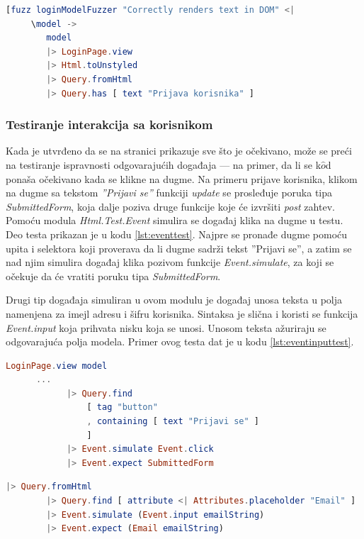 \documentclass[12pt,oneside]{memoir}
\begin{document}
\begin{lstlisting}[language=elm, caption={Test za funkciju \emph{view} modula \emph{LoginPage}},captionpos=b, label={lst:viewtest}]
    [fuzz loginModelFuzzer "Correctly renders text in DOM" <|
     \model ->
        model
        |> LoginPage.view 
        |> Html.toUnstyled
        |> Query.fromHtml
        |> Query.has [ text "Prijava korisnika" ]
\end{lstlisting}


\subsubsection{Testiranje interakcija sa korisnikom}

\par Kada je utvrđeno da se na stranici prikazuje sve što je očekivano, može se preći na testiranje ispravnosti odgovarajućih događaja --- na primer, da li se k$\hat{o}$d ponaša očekivano kada se klikne na dugme. Na primeru prijave korisnika, klikom na dugme sa tekstom \emph{''Prijavi se''} funkciji \emph{update} se prosleđuje poruka tipa \emph{SubmittedForm}, koja dalje poziva druge funkcije koje će izvršiti \emph{post} zahtev. Pomoću modula \emph{Html.Test.Event} simulira se događaj klika na dugme u testu. Deo testa prikazan je u kodu \ref{lst:eventtest}. Najpre se pronađe dugme pomoću upita i selektora koji proverava da li dugme sadrži tekst ''Prijavi se'', a zatim se nad njim simulira događaj klika pozivom funkcije \emph{Event.simulate}, za koji se očekuje da će vratiti poruku tipa \emph{SubmittedForm}. 
\par Drugi tip događaja simuliran u ovom modulu je događaj unosa teksta u polja namenjena za imejl adresu i šifru korisnika. Sintaksa je slična i koristi se funkcija \emph{Event.input} koja prihvata nisku koja se unosi. Unosom teksta ažuriraju se odgovarajuća polja modela. Primer ovog testa dat je u kodu \ref{lst:eventinputtest}. 

\begin{lstlisting}[language=elm, caption={Simulacija događaja klika na dugme u testu funkcije \emph{view} modula \emph{LoginPage}},captionpos=b, label={lst:eventtest}]
LoginPage.view model
	  ... 
            |> Query.find
                [ tag "button"
                , containing [ text "Prijavi se" ]
                ]
            |> Event.simulate Event.click
            |> Event.expect SubmittedForm
\end{lstlisting}

\begin{lstlisting}[language=elm, caption={Simulacija događaja unosa teksta u testu funkcije \emph{view} modula \emph{LoginPage}},captionpos=b, label={lst:eventinputtest}]
        |> Query.fromHtml
        |> Query.find [ attribute <| Attributes.placeholder "Email" ]
        |> Event.simulate (Event.input emailString)
        |> Event.expect (Email emailString)
\end{lstlisting}
\end{document}

